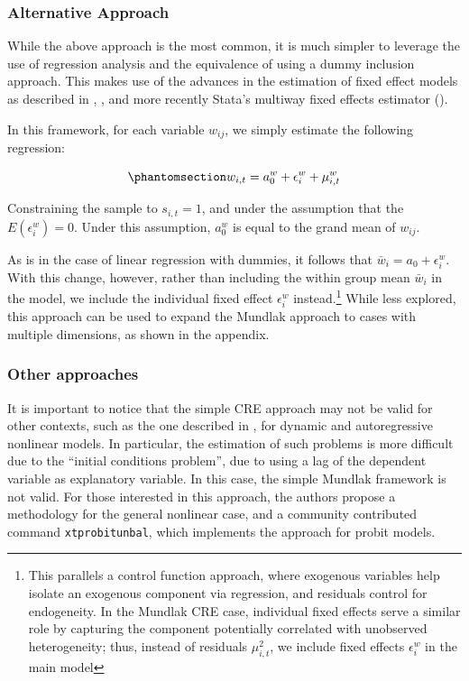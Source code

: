 \documentclass[bib]{statapress}
\begin{document}
\subsubsection{Alternative Approach}\label{sec-alternative}

While the above approach is the most common, it is much simpler to
leverage the use of regression analysis and the equivalence of using a
dummy inclusion approach. This makes use of the advances in the
estimation of fixed effect models as described in \citet{correia_2016},
\citet{rios2015}, and more recently Stata's multiway fixed effects
estimator (\citet{stata19}).

In this framework, for each variable \(w_{ij}\), we simply estimate the
following regression:

\begin{equation}\phantomsection\label{eq-cre-analogy}{w_{i,t} = a^w_0 + \epsilon^w_i + \mu^w_{i,t}
}\end{equation}

Constraining the sample to \(s_{i,t} = 1\), and under the assumption
that the \(E(\epsilon^w_i) = 0\). Under this assumption, \(a^w_0\) is
equal to the grand mean of \(w_{ij}\).

As is in the case of linear regression with dummies, it follows that
\(\bar w_i = a_0 + \epsilon^w_i\). With this change, however, rather
than including the within group mean \(\bar w_i\) in the model, we
include the individual fixed effect \(\epsilon^w_i\) instead.\footnote{This
  parallels a control function approach, where exogenous variables help
  isolate an exogenous component via regression, and residuals control
  for endogeneity. In the Mundlak CRE case, individual fixed effects
  serve a similar role by capturing the component potentially correlated
  with unobserved heterogeneity; thus, instead of residuals
  \(\mu^2_{i,t}\), we include fixed effects \(\epsilon^w_i\) in the main
  model} While less explored, this approach can be used to expand the
Mundlak approach to cases with multiple dimensions, as shown in the
appendix.

\subsubsection{Other approaches}\label{other-approaches}

It is important to notice that the simple CRE approach may not be valid
for other contexts, such as the one described in \citet{albarran2019},
for dynamic and autoregressive nonlinear models. In particular, the
estimation of such problems is more difficult due to the ``initial
conditions problem'', due to using a lag of the dependent variable as
explanatory variable. In this case, the simple Mundlak framework is not
valid. For those interested in this approach, the authors propose a
methodology for the general nonlinear case, and a community contributed
command \texttt{xtprobitunbal}, which implements the approach for probit
models.
\end{document}
